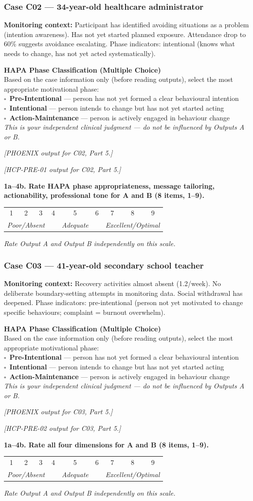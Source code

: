 \documentclass[11pt,a4paper]{article}
\makeatletter
\newcommand{\likertscale}[1]{%
\par\vspace{0.15em}%
\noindent\begin{tcolorbox}[colback=ScaleBG,colframe=BorderGrey,boxrule=0.4pt,arc=1mm,left=5pt,right=5pt,top=4pt,bottom=4pt]%
\small\textbf{\color{SlateMid}#1}\\[0.25em]%
\begin{tabular}{@{}*{9}{c}@{}}%
1 & 2 & 3 & 4 & 5 & 6 & 7 & 8 & 9 \\%
\multicolumn{3}{l}{\tiny\itshape Poor/Absent} & & \multicolumn{1}{c}{\tiny\itshape Adequate} & & \multicolumn{3}{r}{\tiny\itshape Excellent/Optimal}%
\end{tabular}%
\quad\textit{Rate Output A and Output B independently on this scale.}%
\end{tcolorbox}\vspace{0.1em}}
\newcommand{\hapascale}{%
\par\vspace{0.15em}%
\noindent\begin{tcolorbox}[colback=AccentRed,colframe=RichPurple,boxrule=0.5pt,arc=1mm,left=6pt,right=6pt,top=4pt,bottom=4pt]%
\small\textbf{\color{RichPurple}HAPA Phase Classification (Multiple Choice)}\\[0.15em]%
Based on the case information only (before reading outputs), select the most appropriate motivational phase:\\[0.1em]%
$\square$~\textbf{Pre-Intentional} --- person has not yet formed a clear behavioural intention\\%
$\square$~\textbf{Intentional} --- person intends to change but has not yet started acting\\%
$\square$~\textbf{Action-Maintenance} --- person is actively engaged in behaviour change\\[0.1em]%
\textit{This is your independent clinical judgment --- do not be influenced by Outputs A or B.}%
\end{tcolorbox}\vspace{0.1em}}
\makeatother
\begin{document}
\subsubsection*{Case C02 --- 34-year-old healthcare administrator}
\begin{tcolorbox}[colback=AccentAmber,colframe=GoldAmber,boxrule=0.7pt,arc=2mm,left=8pt,right=8pt,top=7pt,bottom=7pt]
\small\textbf{Monitoring context:} Participant has identified avoiding situations as a problem (intention awareness). Has not yet started planned exposure. Attendance drop to 60\% suggests avoidance escalating. Phase indicators: intentional (knows what needs to change, has not yet acted systematically).
\end{tcolorbox}
\hapascale
\begin{outputAbox}\small\textit{[PHOENIX output for C02, Part 5.]}\end{outputAbox}
\begin{outputBbox}\small\textit{[HCP-PRE-01 output for C02, Part 5.]}\end{outputBbox}
\begin{ratingbox}
\likertscale{1a--4b. Rate \textbf{HAPA phase appropriateness, message tailoring, actionability, professional tone} for A and B (8 items, 1--9).}
\end{ratingbox}

\vspace{0.4em}

\subsubsection*{Case C03 --- 41-year-old secondary school teacher}
\begin{tcolorbox}[colback=AccentAmber,colframe=GoldAmber,boxrule=0.7pt,arc=2mm,left=8pt,right=8pt,top=7pt,bottom=7pt]
\small\textbf{Monitoring context:} Recovery activities almost absent (1.2/week). No deliberate boundary-setting attempts in monitoring data. Social withdrawal has deepened. Phase indicators: pre-intentional (person not yet motivated to change specific behaviours; complaint = burnout overwhelm).
\end{tcolorbox}
\hapascale
\begin{outputAbox}\small\textit{[PHOENIX output for C03, Part 5.]}\end{outputAbox}
\begin{outputBbox}\small\textit{[HCP-PRE-02 output for C03, Part 5.]}\end{outputBbox}
\begin{ratingbox}
\likertscale{1a--4b. Rate all four dimensions for A and B (8 items, 1--9).}
\end{ratingbox}
\end{document}
